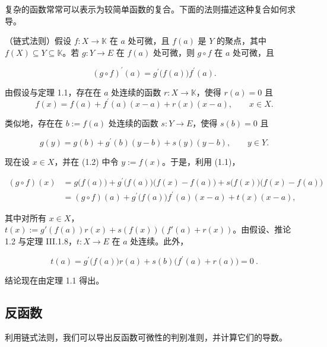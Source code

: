 复杂的函数常常可以表示为较简单函数的复合。下面的法则描述这种复合如何求导。

\begin{theorem}

（链式法则）假设 $f: X \to \mathbb{K}$ 在 $a$ 处可微，且 $f(a)$ 是 $Y$ 的聚点，其中 $f(X) \subseteq Y \subseteq \mathbb{K}$。若 $g: Y \to E$ 在 $f(a)$ 处可微，则 $g \circ f$ 在 $a$ 处可微，且

\[
(g\circ f)^{\prime}(a)=g^{\prime}\big(f(a)\big)f^{\prime}(a).
\]

\proofhead
由假设与定理 1.1，存在在 $a$ 处连续的函数 $ r: X \to \mathbb{K} $，使得 $ r(a) = 0 $ 且
\begin{equation}
f(x)=f(a)+f^{\prime}(a)(x-a)+r(x)(x-a),\qquad x\in X.
\end{equation}

类似地，存在在 $b:=f(a)$ 处连续的函数 $s:Y\to E$，使得 $s(b)=0$ 且

\begin{equation}
g(y)=g(b)+g^{\prime}(b)(y-b)+s(y)(y-b),\qquad y\in Y.
\end{equation}

现在设 $ x \in X $，并在 (1.2) 中令 $ y := f(x) $。于是，利用 (1.1)，

\begin{equation*}
\begin{aligned}
(g\circ f)(x)&=g\big(f(a)\big)+g^{\prime}\big(f(a)\big)\big(f(x)-f(a)\big)+s\big(f(x)\big)\big(f(x)-f(a)\big)\\&=(g\circ f)(a)+g^{\prime}\big(f(a)\big)f^{\prime}(a)(x-a)+t(x)(x-a),
\end{aligned}
\end{equation*}

其中对所有 $ x \in X $，$ t(x) := g'(f(a))r(x) + s(f(x))\left(f'(a) + r(x)\right) $。由假设、推论 1.2 与定理 III.1.8，$ t: X \to E $ 在 $a$ 处连续。此外，

\[
t(a)=g^{\prime}\big(f(a)\big)r(a)+s(b)\big(f^{\prime}(a)+r(a)\big)=0~.
\]

结论现在由定理 1.1 得出。

\end{theorem}

\subsection*{反函数}

利用链式法则，我们可以导出反函数可微性的判别准则，并计算它们的导数。

